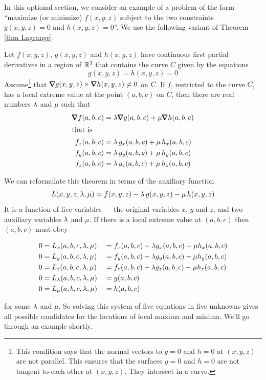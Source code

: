 In this optional section, we consider an example of a problem of 
the form ``maximize (or minimize)  $f(x,y,z)$ subject to the two
constraints $g(x,y,z)=0$ and $h(x,y,z)=0$''. We use the following variant of
Theorem \ref{thm Lagrange}.
\begin{theorem}\label{thm doubleLagrange}
Let $f(x,y,z)$, $g(x,y,z)$ and $h(x,y,z)$ have continuous first 
partial derivatives in a region of $\mathbb{R}^3$ that contains the curve 
$C$ given by the equations  
\begin{equation*}
g(x,y,z)=h(x,y,z)=0
\end{equation*}
Assume\footnote{This condition says that the normal vectors to $g=0$ and $h=0$
at $(x,y,z)$ are not parallel. This ensures that the surfaces $g=0$ 
and $h=0$ are not tangent to each other at $(x,y,z)$. They intersect
in a curve.} that $\vnabla g(x,y,z)\times \vnabla h(x,y,z) \ne 0$ 
on $C$. If $f$, restricted 
to the curve $C$, has a local extreme value at the point $(a,b,c)$ on $C$, 
then there are real numbers $\lambda$ and $\mu$ such that
\begin{align*}
\vnabla f(a,b,c) &= \la\vnabla g(a,b,c) + \mu\vnabla h(a,b,c) \\
\intertext{that is}
f_x(a,b,c) &= \la\, g_x(a,b,c) + \mu\, h_x(a,b,c)\\
f_y(a,b,c) &= \la\, g_y(a,b,c) + \mu\, h_y(a,b,c)\\
f_z(a,b,c) &= \la\, g_z(a,b,c) + \mu\, h_z(a,b,c)
\end{align*}
\end{theorem}
We can reformulate this theorem in terms of the auxiliary function
\begin{equation*}
L(x,y,z,\lambda,\mu)=f(x,y,z)-\lambda\, g(x,y,z) - \mu\, h(x,y,z)
\end{equation*}
It is a function of five variables --- the original variables $x$, $y$
and $z$, and two auxiliary variables $\lambda$ and $\mu$. 
If there is a local extreme value at $(a,b,c)$ then $(a,b,c)$ must obey
\begin{impeqn}\label{eqn Ll}
\begin{alignat*}{3}
0&= L_x(a,b,c,\lambda,\mu)
 &&= f_x(a,b,c) - \lambda g_x(a,b,c) -\mu h_x(a,b,c)\\
0&= L_y(a,b,c,\lambda,\mu)
 &&= f_y(a,b,c) - \lambda g_y(a,b,c) -\mu h_y(a,b,c)\\
0&=L_z(a,b,c,\lambda,\mu)
 &&= f_z(a,b,c) - \lambda g_z(a,b,c) -\mu h_z(a,b,c) \\
0&=L_\lambda(a,b,c,\lambda,\mu)
 &&= g(a,b,c)\\
0&=L_\mu(a,b,c,\lambda,\mu)
 &&= h(a,b,c)
\end{alignat*}
\end{impeqn}\noindent
for some $\lambda$ and $\mu$. So solving this system of five equations in five
unknowns gives all possible candidates for the locations of local maxima
and minima. We'll go through an example shortly.

